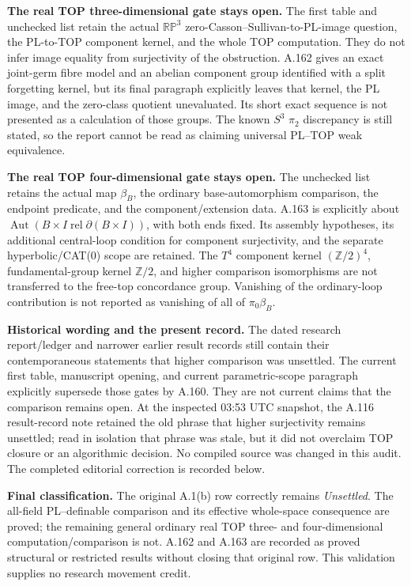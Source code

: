 \textbf{The real TOP three-dimensional gate stays open.}\quad
The first table and unchecked list retain the actual
\(\mathbb{RP}^3\) zero-Casson--Sullivan-to-PL-image question, the
PL-to-TOP component kernel, and the whole TOP computation.  They do
not infer image equality from surjectivity of the obstruction.
A.162 gives an exact joint-germ fibre model and an abelian component
group identified with a split forgetting kernel, but its final
paragraph explicitly leaves that kernel, the PL image, and the
zero-class quotient unevaluated.  Its short exact sequence is not
presented as a calculation of those groups.  The known \(S^3\)
\(\pi_2\) discrepancy is still stated, so the report cannot be read as
claiming universal PL--TOP weak equivalence.

\textbf{The real TOP four-dimensional gate stays open.}\quad
The unchecked list retains the actual map \(\beta_B\), the ordinary
base-automorphism comparison, the endpoint predicate, and the
component/extension data.  A.163 is explicitly about
\(\operatorname{Aut}(B\times I\operatorname{ rel}\partial(B\times I))\),
with both ends fixed.  Its assembly hypotheses, its additional
central-loop condition for component surjectivity, and the separate
hyperbolic/CAT(0) scope are retained.  The \(T^4\) component kernel
\((\mathbb Z/2)^4\), fundamental-group kernel \(\mathbb Z/2\), and
higher comparison isomorphisms are not transferred to the free-top
concordance group.  Vanishing of the ordinary-loop contribution is
not reported as vanishing of all of \(\pi_0\beta_B\).

\textbf{Historical wording and the present record.}\quad
The dated research report/ledger and narrower earlier result records
still contain their contemporaneous statements that higher comparison
was unsettled.  The current first table, manuscript opening, and
current parametric-scope paragraph explicitly supersede those gates
by A.160.  They are not current claims that the comparison remains
open.  At the inspected 03:53 UTC snapshot, the A.116 result-record note
retained the old phrase that higher surjectivity remains unsettled;
read in isolation that phrase was stale, but it did not overclaim TOP
closure or an algorithmic decision.  No compiled source was changed
in this audit.  The completed editorial correction is recorded below.

\textbf{Final classification.}\quad
The original A.1(b) row correctly remains \emph{Unsettled}.  The
all-field PL--definable comparison and its effective whole-space
consequence are proved; the remaining general ordinary real TOP
three- and four-dimensional computation/comparison is not.  A.162 and
A.163 are recorded as proved structural or restricted results without
closing that original row.  This validation supplies no research
movement credit.

